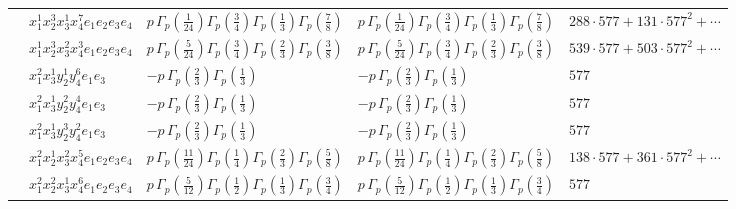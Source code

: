 \documentclass[11pt]{article}
\begin{document}
\begin{table}[ht]
{\begin{tabular}{@{}lllll@{}}
 & $x_{1}^{1} x_{2}^{3} x_{3}^{1} x_{4}^{7}  e_{1} e_{2} e_{3} e_{4}$ & $p \, \Gamma_p \left( \frac{1}{24} \right) \Gamma_p \left( \frac{3}{4} \right) \Gamma_p \left( \frac{1}{3} \right) \Gamma_p \left( \frac{7}{8} \right)$ & $p \, \Gamma_p \left( \frac{1}{24} \right) \Gamma_p \left( \frac{3}{4} \right) \Gamma_p \left( \frac{1}{3} \right) \Gamma_p \left( \frac{7}{8} \right)$ & $288{\cdot}577{+}131{\cdot}577^{2}{+}\cdots$ \\
 & $x_{1}^{1} x_{2}^{3} x_{3}^{2} x_{4}^{3}  e_{1} e_{2} e_{3} e_{4}$ & $p \, \Gamma_p \left( \frac{5}{24} \right) \Gamma_p \left( \frac{3}{4} \right) \Gamma_p \left( \frac{2}{3} \right) \Gamma_p \left( \frac{3}{8} \right)$ & $p \, \Gamma_p \left( \frac{5}{24} \right) \Gamma_p \left( \frac{3}{4} \right) \Gamma_p \left( \frac{2}{3} \right) \Gamma_p \left( \frac{3}{8} \right)$ & $539{\cdot}577{+}503{\cdot}577^{2}{+}\cdots$ \\
 & $x_{1}^{2} x_{3}^{1} y_{2}^{1} y_{4}^{6} e_{1} e_{3}$ & $- p \, \Gamma_p \left( \frac{2}{3} \right) \Gamma_p \left( \frac{1}{3} \right)$ & $- p \, \Gamma_p \left( \frac{2}{3} \right) \Gamma_p \left( \frac{1}{3} \right)$ & $577$ \\
 & $x_{1}^{2} x_{3}^{1} y_{2}^{2} y_{4}^{4} e_{1} e_{3}$ & $- p \, \Gamma_p \left( \frac{2}{3} \right) \Gamma_p \left( \frac{1}{3} \right)$ & $- p \, \Gamma_p \left( \frac{2}{3} \right) \Gamma_p \left( \frac{1}{3} \right)$ & $577$ \\
 & $x_{1}^{2} x_{3}^{1} y_{2}^{3} y_{4}^{2} e_{1} e_{3}$ & $- p \, \Gamma_p \left( \frac{2}{3} \right) \Gamma_p \left( \frac{1}{3} \right)$ & $- p \, \Gamma_p \left( \frac{2}{3} \right) \Gamma_p \left( \frac{1}{3} \right)$ & $577$ \\
 & $x_{1}^{2} x_{2}^{1} x_{3}^{2} x_{4}^{5}  e_{1} e_{2} e_{3} e_{4}$ & $p \, \Gamma_p \left( \frac{11}{24} \right) \Gamma_p \left( \frac{1}{4} \right) \Gamma_p \left( \frac{2}{3} \right) \Gamma_p \left( \frac{5}{8} \right)$ & $p \, \Gamma_p \left( \frac{11}{24} \right) \Gamma_p \left( \frac{1}{4} \right) \Gamma_p \left( \frac{2}{3} \right) \Gamma_p \left( \frac{5}{8} \right)$ & $138{\cdot}577{+}361{\cdot}577^{2}{+}\cdots$ \\
 & $x_{1}^{2} x_{2}^{2} x_{3}^{1} x_{4}^{6}  e_{1} e_{2} e_{3} e_{4}$ & $p \, \Gamma_p \left( \frac{5}{12} \right) \Gamma_p \left( \frac{1}{2} \right) \Gamma_p \left( \frac{1}{3} \right) \Gamma_p \left( \frac{3}{4} \right)$ & $p \, \Gamma_p \left( \frac{5}{12} \right) \Gamma_p \left( \frac{1}{2} \right) \Gamma_p \left( \frac{1}{3} \right) \Gamma_p \left( \frac{3}{4} \right)$ & $577$ \\

\end{tabular}}
\end{table}
\end{document}

